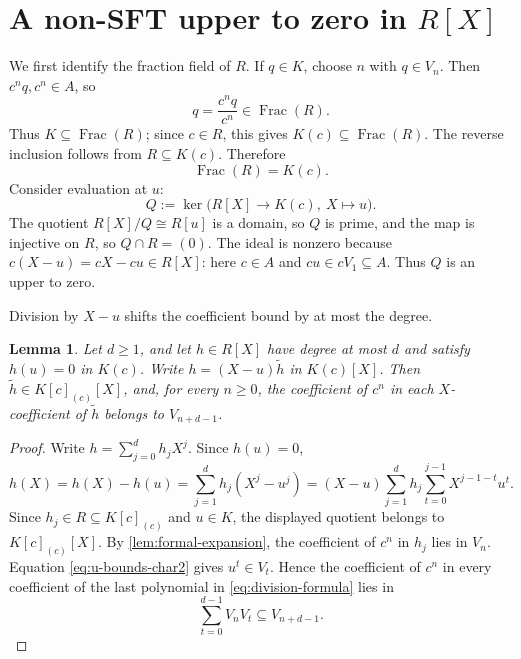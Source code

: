 \documentclass[11pt,reqno]{amsart}
\numberwithin{equation}{section}
\theoremstyle{plain}
\newtheorem{lemma}[theorem]{Lemma}
\theoremstyle{definition}
\theoremstyle{remark}
\newcommand{\Frac}{\operatorname{Frac}}
\begin{document}
\section{A non-SFT upper to zero in \texorpdfstring{$R[X]$}{R[X]}}
\label{sec:bad-prime}

We first identify the fraction field of $R$.  If $q\in K$, choose $n$ with
$q\in V_n$.  Then $c^nq,c^n\in A$, so
\[
  q=\frac{c^nq}{c^n}\in\Frac(R).
\]
Thus $K\subseteq\Frac(R)$; since $c\in R$, this gives
$K(c)\subseteq\Frac(R)$.  The reverse inclusion follows from
$R\subseteq K(c)$.  Therefore
\begin{equation}\label{eq:fraction-field}
  \Frac(R)=K(c).
\end{equation}
Consider evaluation at $u$:
\begin{equation}\label{eq:Q}
  Q:=\ker\bigl(R[X]\longrightarrow K(c),\ X\longmapsto u\bigr).
\end{equation}
The quotient $R[X]/Q\cong R[u]$ is a domain, so $Q$ is prime, and the map
is injective on $R$, so $Q\cap R=(0)$.  The ideal is nonzero because
$c(X-u)=cX-cu\in R[X]$: here $c\in A$ and $cu\in cV_1\subseteq A$.
Thus $Q$ is an upper to zero.

Division by $X-u$ shifts the coefficient bound by at most the degree.

\begin{lemma}\label{lem:division-char2}
Let $d\geq1$, and let $h\in R[X]$ have degree at most $d$ and satisfy
$h(u)=0$ in $K(c)$.  Write $h=(X-u)\widetilde h$ in $K(c)[X]$.  Then
$\widetilde h\in K[c]_{(c)}[X]$, and, for every $n\geq0$, the coefficient
of $c^n$ in each $X$-coefficient of $\widetilde h$ belongs to
$V_{n+d-1}$.
\end{lemma}

\begin{proof}
Write $h=\sum_{j=0}^dh_jX^j$.  Since $h(u)=0$,
\begin{equation}\label{eq:division-formula}
 h(X)=h(X)-h(u)=\sum_{j=1}^dh_j(X^j-u^j)
 =(X-u)\sum_{j=1}^dh_j\sum_{t=0}^{j-1}X^{j-1-t}u^t.
\end{equation}
Since $h_j\in R\subseteq K[c]_{(c)}$ and $u\in K$, the displayed quotient
belongs to $K[c]_{(c)}[X]$.
By \cref{lem:formal-expansion}, the coefficient of $c^n$ in $h_j$ lies in
$V_n$.  Equation \eqref{eq:u-bounds-char2} gives $u^t\in V_t$.  Hence the
coefficient of $c^n$ in every coefficient of the last polynomial in
\eqref{eq:division-formula} lies in
\[
  \sum_{t=0}^{d-1}V_nV_t\subseteq V_{n+d-1}.
\]
\end{proof}
\end{document}
